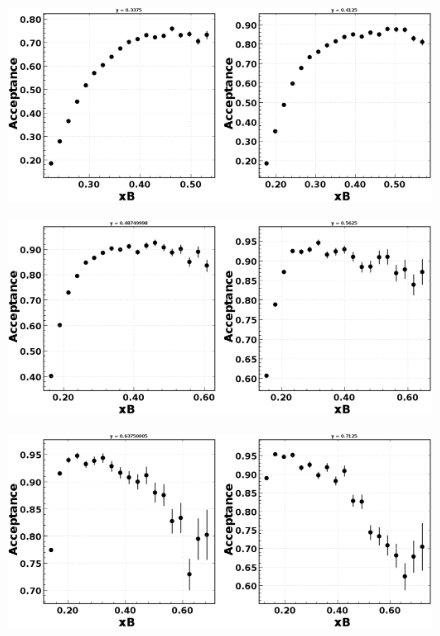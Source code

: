 \begin{figure}[h!]
	\centering
	\includegraphics[width=0.9\linewidth]{figures/rga/acceptance0.png}
	\caption{}
	\label{fig:rga_acc0}
\end{figure}
\begin{figure}[h!]
	\centering
	\includegraphics[width=0.9\linewidth]{figures/rga/acceptance1.png}
	\caption{}
	\label{fig:rga_acc1}
\end{figure}
\begin{figure}[h!]
	\centering
	\includegraphics[width=0.9\linewidth]{figures/rga/acceptance2.png}
	\caption{}
	\label{fig:rga_acc2}
\end{figure}

